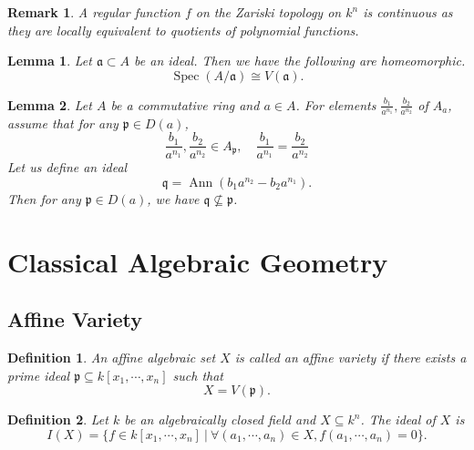 \documentclass{article}
\newtheorem{definition}{Definition}[section]
\newtheorem{lemma}{Lemma}[section]
\newtheorem{remark}{Remark}[section]
\numberwithin{equation}{section}
\DeclareMathOperator{\Ann}{Ann}
\DeclareMathOperator{\Spec}{Spec}
\begin{document}
\begin{remark}
A regular function $f$ on the Zariski topology on $k^n$ is continuous as they are locally equivalent to quotients of polynomial functions.
\label{reg_cont_inc}
\end{remark}

\begin{lemma}
Let $\mathfrak{a}\subset A$ be an ideal. Then we have the following are homeomorphic.
\begin{equation*}
\Spec(A/\mathfrak{a}) \cong V(\mathfrak{a}).
\end{equation*}
\end{lemma}

\begin{lemma}
Let $A$ be a commutative ring and $a\in A$. For elements ${\frac {b_1} {a^{n_1}}},{\frac {b_2} {a^{n_2}}}$ of $A_a$, assume that for any $\mathfrak{p}\in D(a)$, 
\begin{equation*}
{\frac {b_1} {a^{n_1}}},{\frac {b_2} {a^{n_2}}}\in A_{\mathfrak{p}}, \quad {\frac {b_1} {a^{n_1}}}={\frac {b_2} {a^{n_2}}}
\end{equation*}
Let us define an ideal
\begin{equation*}
\mathfrak{q} = \Ann(b_1a^{n_2}-b_2a^{n_1}).
\end{equation*}
Then for any $\mathfrak{p}\in D(a)$, we have $\mathfrak{q}\not\subseteq \mathfrak{p}$.
\end{lemma}

\section{Classical Algebraic Geometry}

\subsection{Affine Variety}

\begin{definition}
An affine algebraic set $X$ is called an affine variety if there exists a prime ideal $\mathfrak{p}\subseteq k[x_1,\cdots,x_n]$ such that
\begin{equation*}
X=V(\mathfrak{p}).
\end{equation*}
\end{definition}

\begin{definition}
Let $k$ be an algebraically closed field and $X\subseteq k^n$. The ideal of $X$ is 
\begin{equation*}
I(X)=\{f\in k[x_1,\cdots,x_n]\:|\: \forall (a_1,\cdots,a_n)\in X, f(a_1,\cdots,a_n) = 0\}.
\end{equation*}
\end{definition}
\end{document}
